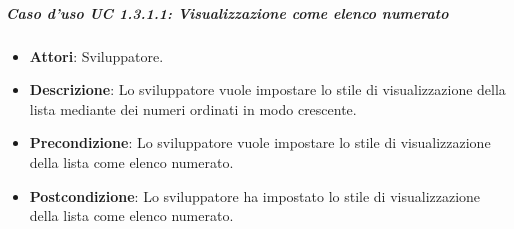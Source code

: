 \subparagraph{Caso d'uso UC 1.3.1.1: Visualizzazione come elenco numerato}

\FloatBarrier
\begin{itemize}
\item\textbf{Attori}: Sviluppatore.
\item\textbf{Descrizione}: Lo sviluppatore vuole impostare lo stile di visualizzazione della lista mediante dei numeri ordinati in modo crescente.
\item\textbf{Precondizione}: Lo sviluppatore vuole impostare lo stile di visualizzazione della lista come elenco numerato.
\item\textbf{Postcondizione}: Lo sviluppatore ha impostato lo stile di visualizzazione della lista come elenco numerato.
\end{itemize}
